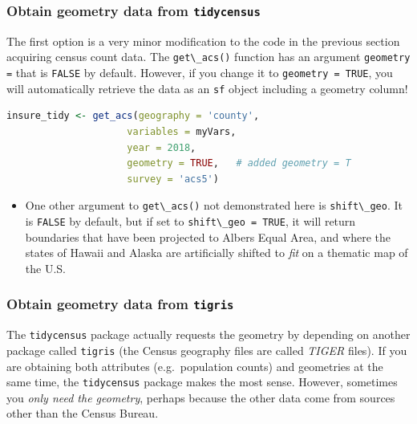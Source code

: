 \documentclass[
]{book}
\newcommand{\passthrough}[1]{#1}
\newenvironment{rmdblock}[1]
  {%
  \begin{itemize}
  \renewcommand{\labelitemi}{
    \raisebox{-.7\height}[0pt][0pt]{
      {\setkeys{Gin}{width=3em,keepaspectratio}\texttt{[image: images/\#1]}}
    }
  }
  \item
  }
  {
  \end{itemize}
  }
\newenvironment{rmdnote}
  {\begin{rmdblock}{note}}
  {\end{rmdblock}}
\begin{document}
\hypertarget{obtain-geometry-data-from-tidycensus}{%
\subsubsection{\texorpdfstring{Obtain geometry data from \texttt{tidycensus}}{Obtain geometry data from tidycensus}}\label{obtain-geometry-data-from-tidycensus}}

The first option is a very minor modification to the code in the previous section acquiring census count data. The \passthrough{\lstinline!get\_acs()!} function has an argument \passthrough{\lstinline!geometry =!} that is \passthrough{\lstinline!FALSE!} by default. However, if you change it to \passthrough{\lstinline!geometry = TRUE!}, you will automatically retrieve the data as an \passthrough{\lstinline!sf!} object including a geometry column!

\begin{lstlisting}[language=R]
insure_tidy <- get_acs(geography = 'county',
                     variables = myVars,
                     year = 2018, 
                     geometry = TRUE,   # added geometry = T
                     survey = 'acs5') 
\end{lstlisting}

\begin{rmdnote}
One other argument to \passthrough{\lstinline!get\_acs()!} not demonstrated here is \passthrough{\lstinline!shift\_geo!}. It is \passthrough{\lstinline!FALSE!} by default, but if set to \passthrough{\lstinline!shift\_geo = TRUE!}, it will return boundaries that have been projected to Albers Equal Area, and where the states of Hawaii and Alaska are artificially shifted to \emph{fit} on a thematic map of the U.S.
\end{rmdnote}

\hypertarget{obtain-geometry-data-from-tigris}{%
\subsubsection{\texorpdfstring{Obtain geometry data from \texttt{tigris}}{Obtain geometry data from tigris}}\label{obtain-geometry-data-from-tigris}}

The \passthrough{\lstinline!tidycensus!} package actually requests the geometry by depending on another package called \passthrough{\lstinline!tigris!} (the Census geography files are called \emph{TIGER} files). If you are obtaining both attributes (e.g.~population counts) and geometries at the same time, the \passthrough{\lstinline!tidycensus!} package makes the most sense. However, sometimes you \emph{only need the geometry}, perhaps because the other data come from sources other than the Census Bureau.
\end{document}
